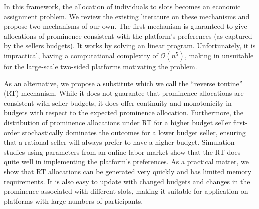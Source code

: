 In this framework, the allocation of individuals to slots becomes an
economic assignment problem. We review the existing literature on
these mechanisms and propose two mechanisms of our own. The first
mechanism is guaranteed to give allocations of prominence consistent
with the platform's preferences (as captured by the sellers
budgets). It works by solving an linear program. Unfortunately, it is
impractical, having a computational complexity of $\mathcal{O}(n^5)$,
making in unsuitable for the large-scale two-sided platforms
motivating the problem.

As an alternative, we propose a substitute which we call the ``reverse
tontine'' (RT) mechanism. While it does not guarantee that prominence
allocations are consistent with seller budgets, it does offer
continuity and monotonicity in budgets with respect to the expected
prominence allocation. Furthermore, the distribution of prominence
allocations under RT for a higher budget seller first-order
stochastically dominates the outcomes for a lower budget seller,
ensuring that a rational seller will always prefer to have a higher
budget. Simulation studies using parameters from an online labor
market show that the RT does quite well in implementing the platform's
preferences. As a practical matter, we show that RT allocations can be
generated very quickly and has limited memory requirements. It is also
easy to update with changed budgets and changes in the prominence
associated with different slots, making it suitable for application on
platforms with large numbers of participants.


